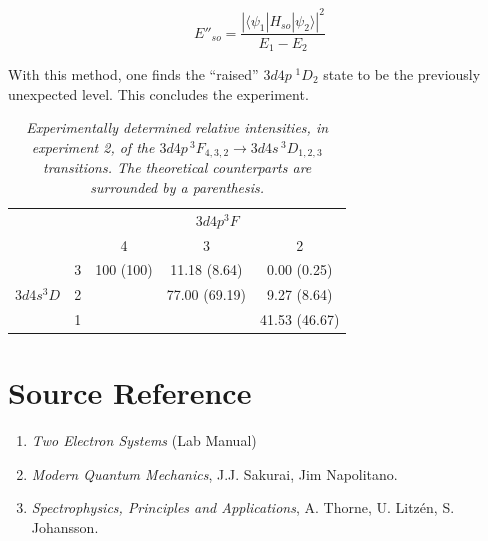 \documentclass[a4paper]{article}
\begin{document}
\[
E''_{so} = \frac{|\langle \psi_1 | H_{so} | \psi_2 \rangle|^2}{E_1 - E_2}
\]

With this method, one finds the ``raised'' $3d4p\;^1D_2$ state to be the previously unexpected level. This concludes the experiment.

\begin{table}[htb!]
\centering
\begin{tabular}{cc|c|c|c|}
\cline{3-5}
& & \multicolumn{3}{c|}{$3d4p ^3F$}\\
\cline{3-5}
& & 4 & 3 & 2\\
\hline
\multicolumn{1}{|c|}{\multirow{3}{*}{$3d4s ^3D$}} & 3 & 100 (100) &
11.18 (8.64) & 0.00 (0.25) \\
\multicolumn{1}{|c|}{} & 2 & & 77.00 (69.19) & 9.27 (8.64)\\
\multicolumn{1}{|c|}{} & 1 & & & 41.53 (46.67) \\
\hline
\end{tabular}
\caption{\it Experimentally determined relative intensities, in experiment 2, of the
$3d4p\,^3F_{4,3,2} \to 3d4s\,^3D_{1,2,3}$ transitions. The
theoretical counterparts are surrounded by a parenthesis.}
\label{tab:exp-intensity22}
\end{table}

\section{Source Reference}

\begin{enumerate}

\item \textit{Two Electron Systems} (Lab Manual)

\item \textit{Modern Quantum Mechanics}, J.J. Sakurai, Jim Napolitano.

\item \textit{Spectrophysics, Principles and Applications}, A. Thorne, U. Litz\'en, S. Johansson.

\end{enumerate}
\end{document}

